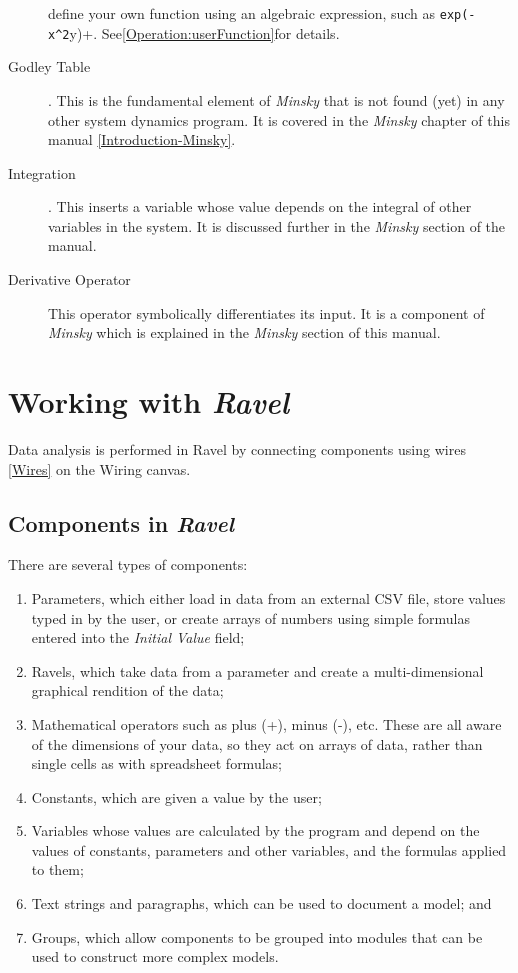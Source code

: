 \begin{description}
define your own function using an algebraic expression, such as \verb+exp(-x^2+y)+.
See\ref{Operation:userFunction}for details.
\item [{Godley Table}] . \label{GodleyTable}
This is the fundamental element of \emph{Minsky} that is not found
(yet) in any other system dynamics program. It is covered in the \emph{Minsky}
chapter of this manual \ref{Introduction-Minsky}.
\item [{Integration}] . This inserts a variable whose
value depends on the integral of other variables in the system. It
is discussed further in the \emph{Minsky} section of the manual.
\item [{Derivative Operator}]  This operator
symbolically differentiates its input. It is a component of \emph{Minsky}
which is explained in the \emph{Minsky} section of this manual.
\end{description}

\section{Working with \emph{Ravel}}

Data analysis is performed in Ravel by connecting components using
wires \ref{Wires} on the Wiring canvas.

\subsection{Components in \emph{Ravel}}

There are several types of components:
\begin{enumerate}
\item Parameters, which either load in data from an external CSV file, store
values typed in by the user, or create arrays of numbers using simple
formulas entered into the \emph{Initial Value} field;
\item Ravels, which take data from a parameter and create a multi-dimensional
graphical rendition of the data; 
\item Mathematical operators such as plus (+), minus (-), etc. These are
all aware of the dimensions of your data, so they act on arrays of
data, rather than single cells as with spreadsheet formulas; 
\item Constants, which are given a value by the user;
\item Variables whose values are calculated by the program and depend on
the values of constants, parameters and other variables, and the formulas
applied to them;
\item Text strings and paragraphs, which can be used to document a model;
and
\item Groups, which allow components to be grouped into modules that can
be used to construct more complex models. 
\end{enumerate}


